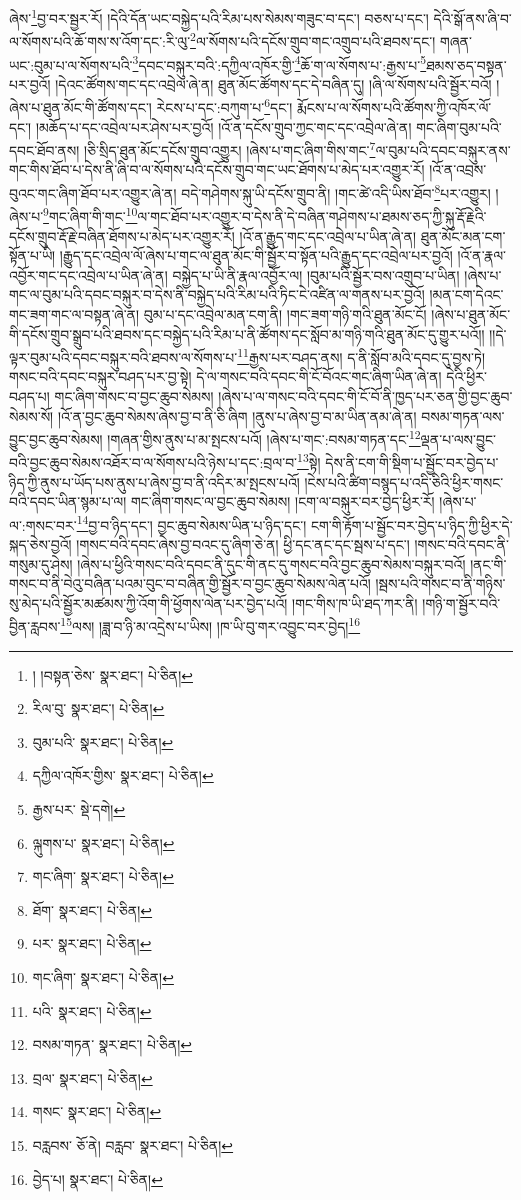 ཞེས་\footnote{། །བསྟན་ཅེས་  སྣར་ཐང་།  པེ་ཅིན། }བྱ་བར་སྦྱར་རོ། །དེའི་དོན་ཡང་བསྐྱེད་པའི་རིམ་པས་སེམས་གཟུང་བ་དང་། བཅས་པ་དང་། དེའི་སྒོ་ནས་ཞི་བ་ལ་སོགས་པའི་ཆོ་གས་ས་འོག་དང་:རི་ལུ་\footnote{རིལ་བུ་  སྣར་ཐང་།  པེ་ཅིན། }ལ་སོགས་པའི་དངོས་གྲུབ་གང་འགྲུབ་པའི་ཐབས་དང་། གཞན་ཡང་:བུམ་པ་ལ་སོགས་པའི་\footnote{བུམ་པའི་  སྣར་ཐང་།  པེ་ཅིན། }དབང་བསྐུར་བའི་:དཀྱིལ་འཁོར་གྱི་\footnote{དཀྱིལ་འཁོར་གྱིས་  སྣར་ཐང་།  པེ་ཅིན། }ཆོ་ག་ལ་སོགས་པ་:རྒྱས་པ་\footnote{རྒྱས་པར་  སྡེ་དགེ། }ཐམས་ཅད་བསྟན་པར་བྱའོ། །དེའང་ཚོགས་གང་དང་འབྲེལ་ཞེ་ན། ཐུན་མོང་ཚོགས་དང་དེ་བཞིན་དུ། །ཞི་ལ་སོགས་པའི་སྦྱོར་བའོ། །ཞེས་པ་ཐུན་མོང་གི་ཚོགས་དང་། རེངས་པ་དང་:བཀུག་པ་\footnote{ལྐུགས་པ་  སྣར་ཐང་།  པེ་ཅིན། }དང་། རྨོངས་པ་ལ་སོགས་པའི་ཚོགས་ཀྱི་འཁོར་ལོ་དང་། །མཆོད་པ་དང་འབྲེལ་པར་ཤེས་པར་བྱའོ། །འོ་ན་དངོས་གྲུབ་ཀྱང་གང་དང་འབྲེལ་ཞེ་ན། གང་ཞིག་བུམ་པའི་དབང་ཐོབ་ནས། །ཅི་སྲིད་ཐུན་མོང་དངོས་གྲུབ་འགྱུར། །ཞེས་པ་གང་ཞིག་གིས་གང་\footnote{གང་ཞིག་  སྣར་ཐང་།  པེ་ཅིན། }ལ་བུམ་པའི་དབང་བསྐུར་ནས་གང་གིས་ཐོབ་པ་དེས་ནི་ཞི་བ་ལ་སོགས་པའི་དངོས་གྲུབ་གང་ཡང་ཐོགས་པ་མེད་པར་འགྱུར་རོ། །འོ་ན་འབྲས་བུའང་གང་ཞིག་ཐོབ་པར་འགྱུར་ཞེ་ན། བདེ་གཤེགས་སྐུ་ཡི་དངོས་གྲུབ་ནི། །གང་ཚེ་འདི་ཡིས་ཐོབ་\footnote{ཐོག་  སྣར་ཐང་།  པེ་ཅིན། }པར་འགྱུར། །ཞེས་པ་\footnote{པར་  སྣར་ཐང་།  པེ་ཅིན། }གང་ཞིག་གི་གང་\footnote{གང་ཞིག་  སྣར་ཐང་།  པེ་ཅིན། }ལ་གང་ཐོབ་པར་འགྱུར་བ་དེས་ནི་དེ་བཞིན་གཤེགས་པ་ཐམས་ཅད་ཀྱི་སྐུ་རྡོ་རྗེའི་དངོས་གྲུབ་རྡོ་རྗེ་བཞིན་ཐོགས་པ་མེད་པར་འགྱུར་རོ། །འོ་ན་རྒྱུད་གང་དང་འབྲེལ་པ་ཡིན་ཞེ་ན། ཐུན་མོང་མན་ངག་སྟོན་པ་ཡི། །རྒྱུད་དང་འབྲེལ་ལོ་ཞེས་པ་གང་ལ་ཐུན་མོང་གི་སྦྱོར་བ་སྟོན་པའི་རྒྱུད་དང་འབྲེལ་པར་བྱའོ། །འོ་ན་རྣལ་འབྱོར་གང་དང་འབྲེལ་པ་ཡིན་ཞེ་ན། བསྐྱེད་པ་ཡི་ནི་རྣལ་འབྱོར་ལ། །བུམ་པའི་སྦྱོར་བས་འགྲུབ་པ་ཡིན། །ཞེས་པ་གང་ལ་བུམ་པའི་དབང་བསྐུར་བ་དེས་ནི་བསྐྱེད་པའི་རིམ་པའི་ཏིང་ངེ་འཛིན་ལ་གནས་པར་བྱའོ། །མན་ངག་དེའང་གང་ཟག་གང་ལ་བསྟན་ཞེ་ན། བུམ་པ་དང་འབྲེལ་མན་ངག་ནི། །གང་ཟག་གཉི་གའི་ཐུན་མོང་ངོ། །ཞེས་པ་ཐུན་མོང་གི་དངོས་གྲུབ་སྒྲུབ་པའི་ཐབས་དང་བསྐྱེད་པའི་རིམ་པ་ནི་ཚོགས་དང་སློབ་མ་གཉི་གའི་ཐུན་མོང་དུ་གྱུར་པའོ།། །།དེ་ལྟར་བུམ་པའི་དབང་བསྐུར་བའི་ཐབས་ལ་སོགས་པ་\footnote{པའི་  སྣར་ཐང་།  པེ་ཅིན། }རྒྱས་པར་བཤད་ནས། ད་ནི་སློབ་མའི་དབང་དུ་བྱས་ཏེ། གསང་བའི་དབང་བསྐུར་བཤད་པར་བྱ་སྟེ། དེ་ལ་གསང་བའི་དབང་གི་ངོ་བོའང་གང་ཞིག་ཡིན་ཞེ་ན། དེའི་ཕྱིར་བཤད་པ། གང་ཞིག་གསང་བ་བྱང་ཆུབ་སེམས། །ཞེས་པ་ལ་གསང་བའི་དབང་གི་ངོ་བོ་ནི་ཁྱད་པར་ཅན་གྱི་བྱང་ཆུབ་སེམས་སོ། །འོ་ན་བྱང་ཆུབ་སེམས་ཞེས་བྱ་བ་ནི་ཅི་ཞིག །ནུས་པ་ཞེས་བྱ་བ་མ་ཡིན་ནམ་ཞེ་ན། བསམ་གཏན་ལས་བྱུང་བྱང་ཆུབ་སེམས། །གཞན་གྱིས་ནུས་པ་མ་སྤངས་པའོ། །ཞེས་པ་གང་:བསམ་གཏན་དང་\footnote{བསམ་གཏན་  སྣར་ཐང་།  པེ་ཅིན། }ལྡན་པ་ལས་བྱུང་བའི་བྱང་ཆུབ་སེམས་འཐོར་བ་ལ་སོགས་པའི་ཉེས་པ་དང་:བྲལ་བ་\footnote{བྲལ་  སྣར་ཐང་།  པེ་ཅིན། }སྟེ། དེས་ནི་ངག་གི་སྡིག་པ་སྦྱོང་བར་བྱེད་པ་ཉིད་ཀྱི་ནུས་པ་ཡོད་པས་ནུས་པ་ཞེས་བྱ་བ་ནི་འདིར་མ་སྤངས་པའོ། །ངེས་པའི་ཚིག་བསྙད་པ་འདི་ཅིའི་ཕྱིར་གསང་བའི་དབང་ཡིན་སྙམ་པ་ལ། གང་ཞིག་གསང་ལ་བྱང་ཆུབ་སེམས། །ངག་ལ་བསྐུར་བར་བྱེད་ཕྱིར་རོ། །ཞེས་པ་ལ་:གསང་བར་\footnote{གསང་  སྣར་ཐང་།  པེ་ཅིན། }བྱ་བ་ཉིད་དང་། བྱང་ཆུབ་སེམས་ཡིན་པ་ཉིད་དང་། ངག་གི་རྟོག་པ་སྦྱོང་བར་བྱེད་པ་ཉིད་ཀྱི་ཕྱིར་དེ་སྐད་ཅེས་བྱའོ། །གསང་བའི་དབང་ཞེས་བྱ་བའང་དུ་ཞིག་ཅེ་ན། ཕྱི་དང་ནང་དང་སྦས་པ་དང་། །གསང་བའི་དབང་ནི་གསུམ་དུ་ཤེས། །ཞེས་པ་ཕྱིའི་གསང་བའི་དབང་ནི་དུང་གི་ནང་དུ་གསང་བའི་བྱང་ཆུབ་སེམས་བསྐུར་བའོ། །ནང་གི་གསང་བ་ནི་བེའུ་བཞིན་པའམ་བུང་བ་བཞིན་གྱི་སྦྱོར་བ་བྱང་ཆུབ་སེམས་ལེན་པའོ། །སྦས་པའི་གསང་བ་ནི་གཉིས་སུ་མེད་པའི་སྦྱོར་མཚམས་ཀྱི་འོག་གི་ཕྱོགས་ལེན་པར་བྱེད་པའོ། །གང་གིས་ཁ་ཡི་ཐད་ཀར་ནི། །གཉི་ག་སྦྱོར་བའི་བྱིན་རླབས་\footnote{བརླབས་  ཅོ་ནེ། བརླབ་  སྣར་ཐང་།  པེ་ཅིན། }ལས། །ཟླ་བ་ཉི་མ་འདྲེས་པ་ཡིས། །ཁ་ཡི་བུ་གར་འབྱུང་བར་བྱེད།\footnote{བྱེད་པ།  སྣར་ཐང་།  པེ་ཅིན། } 